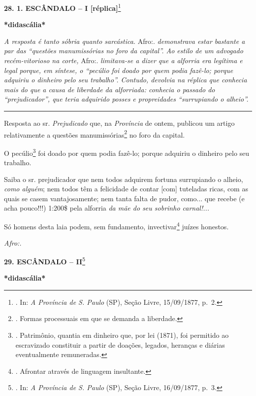 \textbf{28. 1. ESCÂNDALO -- I {[}réplica{]}}\footnote{. In: \emph{A
  Província de S. Paulo} (SP), Seção Livre, 15/09/1877, p.~2.}

\textbf{*didascália*}

\emph{A resposta é tanto sóbria quanto sarcástica.} Afro:.
\emph{demonstrava estar bastante a par das ``questões manumissórias no
foro da capital''. Ao estilo de um advogado recém-vitorioso na corte,}
Afro:. \emph{limitava-se a dizer que a alforria era legítima e legal
porque, em síntese, o ``pecúlio foi doado por quem podia fazê-lo; porque
adquiriu o dinheiro pelo seu trabalho''. Contudo, devolvia na réplica
que conhecia mais do que a causa de liberdade da alforriada: conhecia o
passado do ``prejudicador'', que teria adquirido posses e propreidades
``surrupiando o alheio''. }

\begin{center}\rule{0.5\linewidth}{\linethickness}\end{center}

Resposta ao sr. \emph{Prejudicado} que, na \emph{Província} de ontem,
publicou um artigo relativamente a questões manumissórias\footnote{.
  Formas processuais em que se demanda a liberdade.} no foro da capital.

O pecúlio\footnote{. Patrimônio, quantia em dinheiro que, por lei
  (1871), foi permitido ao escravizado constituir a partir de doações,
  legados, heranças e diárias eventualmente remuneradas.} foi doado por
quem podia fazê-lo; porque adquiriu o dinheiro pelo seu trabalho.

Saiba o sr. prejudicador que nem todos adquirem fortuna surrupiando o
alheio, \emph{como alguém}; nem todos têm a felicidade de contar
{[}com{]} tuteladas ricas, com as quais se casem vantajosamente; nem
tanta falta de pudor, como... que recebe (e acha pouco!!!) 1:200\$ pela
alforria \emph{da mãe do seu sobrinho carnal!...}

Só homens desta laia podem, sem fundamento, invectivar\footnote{.
  Afrontar através de linguagem insultante.} juízes honestos.

\emph{Afro:.}

\textbf{29. ESCÂNDALO -- II}\footnote{. In: \emph{A Província de S.
  Paulo} (SP), Seção Livre, 16/09/1877, p.~3.}

\textbf{*didascália*}


